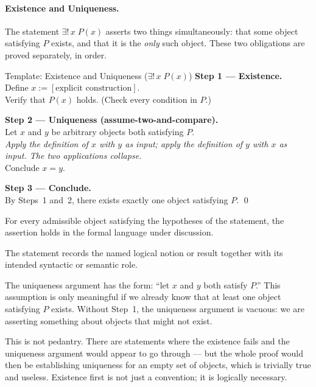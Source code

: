 \paragraph{Existence and Uniqueness.}

The statement $\exists!\, x\; P(x)$ asserts two things simultaneously:
that some object satisfying $P$ exists, and that it is the \emph{only}
such object. These two obligations are proved separately, in order.

\begin{propositionbox}{Template: Existence and Uniqueness ($\exists!\, x\; P(x)$)}
\textbf{Step 1 --- Existence.}\\
Define $x := [\text{explicit construction}]$.\\
Verify that $P(x)$ holds. (Check every condition in $P$.)

\medskip
\textbf{Step 2 --- Uniqueness (assume-two-and-compare).}\\
Let $x$ and $y$ be arbitrary objects both satisfying $P$.\\
\emph{Apply the definition of $x$ with $y$ as input; apply the definition
of $y$ with $x$ as input. The two applications collapse.}\\
Conclude $x = y$.

\medskip
\textbf{Step 3 --- Conclude.}\\
By Steps~1 and~2, there exists exactly one object satisfying $P$. \qed
\end{propositionbox}
\begin{remark*}
For every admissible object satisfying the hypotheses of the statement, the
assertion holds in the formal language under discussion.
\end{remark*}

\begin{remark*}[Interpretation]
The statement records the named logical notion or result together with its
intended syntactic or semantic role.
\end{remark*}


\begin{remark}
The uniqueness argument has the form: ``let $x$ and $y$ both satisfy
$P$.'' This assumption is only meaningful if we already know that at
least one object satisfying $P$ exists. Without Step~1, the uniqueness
argument is vacuous: we are asserting something about objects that
might not exist.

This is not pedantry. There are statements where the existence fails
and the uniqueness argument would appear to go through --- but the
whole proof would then be establishing uniqueness for an empty set of
objects, which is trivially true and useless. Existence first is not
just a convention; it is logically necessary.
\end{remark}

